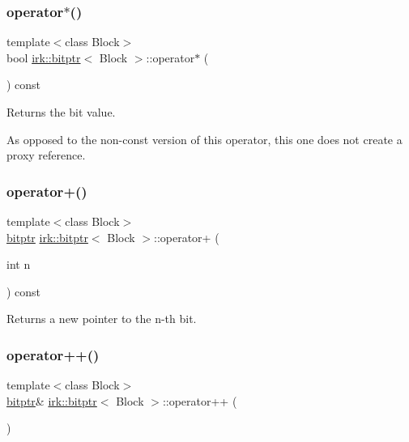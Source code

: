 \subsubsection{\texorpdfstring{operator$\ast$()}{operator*()}\hspace{0.1cm}{\footnotesize\ttfamily [2/2]}}
{\footnotesize\ttfamily template$<$class Block$>$ \\
bool \mbox{\hyperlink{classirk_1_1bitptr}{irk\+::bitptr}}$<$ Block $>$\+::operator$\ast$ (\begin{DoxyParamCaption}{ }\end{DoxyParamCaption}) const\hspace{0.3cm}{\ttfamily [inline]}}



Returns the bit value. 

As opposed to the non-\/const version of this operator, this one does not create a proxy reference. \mbox{\label{classirk_1_1bitptr_ad382cd01b956b2b37d62990ca57de170}} 
\subsubsection{\texorpdfstring{operator+()}{operator+()}}
{\footnotesize\ttfamily template$<$class Block$>$ \\
\mbox{\hyperlink{classirk_1_1bitptr}{bitptr}} \mbox{\hyperlink{classirk_1_1bitptr}{irk\+::bitptr}}$<$ Block $>$\+::operator+ (\begin{DoxyParamCaption}\item[{int}]{n }\end{DoxyParamCaption}) const\hspace{0.3cm}{\ttfamily [inline]}}



Returns a new pointer to the {\ttfamily n}-\/th bit. 

\mbox{\label{classirk_1_1bitptr_abb1d7cadd88cb17c9d672a9653d6cbf8}} 
\subsubsection{\texorpdfstring{operator++()}{operator++()}}
{\footnotesize\ttfamily template$<$class Block$>$ \\
\mbox{\hyperlink{classirk_1_1bitptr}{bitptr}}\& \mbox{\hyperlink{classirk_1_1bitptr}{irk\+::bitptr}}$<$ Block $>$\+::operator++ (\begin{DoxyParamCaption}{ }\end{DoxyParamCaption})\hspace{0.3cm}{\ttfamily [inline]}}




